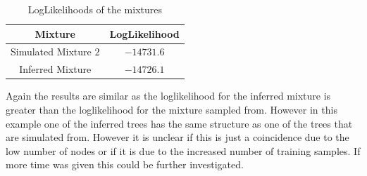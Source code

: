 \begin{table}[H]

  \centering
  \begin{tabular}{ | c | c |}
  \hline
  Mixture & LogLikelihood \\ \hline
  Simulated Mixture $2$ & $-14731.6$\\ \hline
  Inferred Mixture & $-14726.1$\\ \hline
  \end{tabular}
  \caption{LogLikelihoods of the mixtures}
  \label{Likelihood_simulated_1}
\end{table}

Again the results are similar as the loglikelihood for the inferred mixture is greater than the loglikelihood for the mixture sampled from. However in this example one of the inferred trees has the same structure as one of the trees that are simulated from. However it is unclear if this is just a coincidence due to the low number of nodes or if it is due to the increased number of training samples. If more time was given this could be further investigated.
